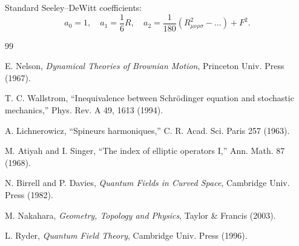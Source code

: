 \documentclass[11pt]{article}
\theoremstyle{remark}
\begin{document}
Standard Seeley--DeWitt coefficients:
\[
a_0=1,\quad
a_1=\frac16R,\quad
a_2=\frac{1}{180}(R_{\mu\nu\rho\sigma}^2-\dots)+F^2.
\]

\begin{thebibliography}{99}

E. Nelson,
\textit{Dynamical Theories of Brownian Motion},
Princeton Univ. Press (1967).

T. C. Wallstrom,
``Inequivalence between Schr\"odinger equation and stochastic mechanics,''
Phys. Rev. A 49, 1613 (1994).

A. Lichnerowicz,
``Spineurs harmoniques,''
C. R. Acad. Sci. Paris 257 (1963).

M. Atiyah and I. Singer,
``The index of elliptic operators I,''
Ann. Math. 87 (1968).

N. Birrell and P. Davies,
\textit{Quantum Fields in Curved Space},
Cambridge Univ. Press (1982).

M. Nakahara,
\textit{Geometry, Topology and Physics},
Taylor \& Francis (2003).

L. Ryder,
\textit{Quantum Field Theory},
Cambridge Univ. Press (1996).

\end{thebibliography}
\end{document}
